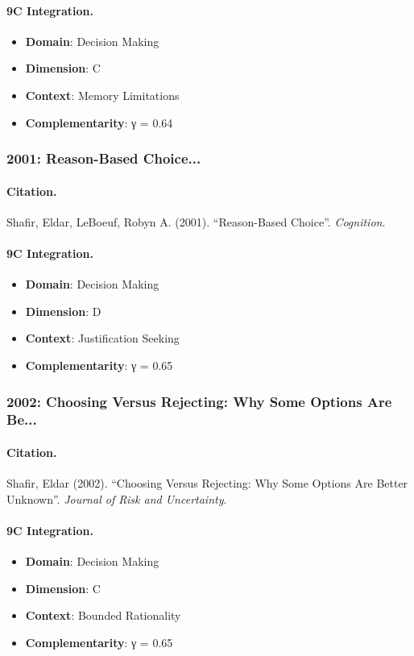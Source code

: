 \paragraph{9C Integration.}
\begin{itemize}[nosep]
  \item \textbf{Domain}: Decision Making
  \item \textbf{Dimension}: C
  \item \textbf{Context}: Memory Limitations
  \item \textbf{Complementarity}: γ = 0.64
\end{itemize}


\subsubsection{2001: Reason-Based Choice...}

\paragraph{Citation.}
Shafir, Eldar, LeBoeuf, Robyn A. (2001). ``Reason-Based Choice''. \textit{Cognition}.

\paragraph{9C Integration.}
\begin{itemize}[nosep]
  \item \textbf{Domain}: Decision Making
  \item \textbf{Dimension}: D
  \item \textbf{Context}: Justification Seeking
  \item \textbf{Complementarity}: γ = 0.65
\end{itemize}


\subsubsection{2002: Choosing Versus Rejecting: Why Some Options Are Be...}

\paragraph{Citation.}
Shafir, Eldar (2002). ``Choosing Versus Rejecting: Why Some Options Are Better Unknown''. \textit{Journal of Risk and Uncertainty}.

\paragraph{9C Integration.}
\begin{itemize}[nosep]
  \item \textbf{Domain}: Decision Making
  \item \textbf{Dimension}: C
  \item \textbf{Context}: Bounded Rationality
  \item \textbf{Complementarity}: γ = 0.65
\end{itemize}



